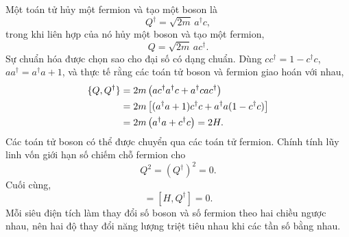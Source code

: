 Một toán tử hủy một fermion và tạo một boson là
\begin{equation}
Q^\dagger=\sqrt{2m}\,a^\dagger c,
\end{equation}
trong khi liên hợp của nó hủy một boson và tạo một fermion,
\begin{equation}
Q=\sqrt{2m}\,a c^\dagger.
\end{equation}
Sự chuẩn hóa được chọn sao cho đại số có dạng chuẩn. Dùng \(cc^\dagger=1-c^\dagger c\), \(aa^\dagger=a^\dagger a+1\), và thực tế rằng các toán tử boson và fermion giao hoán với nhau,
\begin{align}
\{Q,Q^\dagger\}
&=2m\left(ac^\dagger a^\dagger c+a^\dagger c a c^\dagger\right)\notag\\
&=2m\left[(a^\dagger a+1)c^\dagger c
+a^\dagger a(1-c^\dagger c)\right]\notag\\
&=2m\left(a^\dagger a+c^\dagger c\right)=2H.
\label{eq:l7-superalgebra}
\end{align}
Các toán tử boson có thể được chuyển qua các toán tử fermion. Chính tính lũy linh vốn giới hạn số chiếm chỗ fermion cho
\begin{equation}
Q^2=(Q^\dagger)^2=0.
\end{equation}
Cuối cùng,
\begin{equation}
[H,Q]=[H,Q^\dagger]=0.
\label{eq:l7-conserved-supercharges}
\end{equation}
Mỗi siêu điện tích làm thay đổi số boson và số fermion theo hai chiều ngược nhau, nên hai độ thay đổi năng lượng triệt tiêu nhau khi các tần số bằng nhau.

\begin{classroomqa}
\end{classroomqa}

\begin{classroomqa}
\end{classroomqa}

